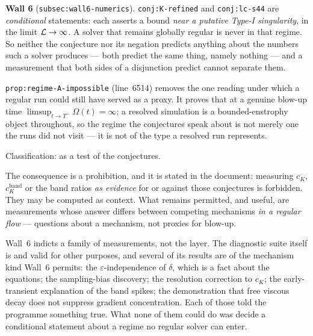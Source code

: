 \begin{record}
\textbf{Wall 6} (\texttt{subsec:wall6-numerics}). \texttt{conj:K-refined} and
\texttt{conj:lc-s44} are \emph{conditional} statements: each asserts a bound
\emph{near a putative Type-I singularity}, in the limit \(\mathcal{L}\to\infty\). A
solver that remains globally regular is never in that regime. So neither the
conjecture nor its negation predicts anything about the numbers such a solver
produces --- both predict the same thing, namely nothing --- and a measurement
that both sides of a disjunction predict cannot separate them.

\smallskip
\texttt{prop:regime-A-impossible} (line~6514) removes the one reading under
which a regular run could still have served as a proxy. It proves that at a
genuine blow-up time \(\limsup_{t\to T^-}\Omega(t)=\infty\); a resolved
simulation is a bounded-enstrophy object throughout, so the regime the
conjectures speak about is not merely one the runs did not visit --- it is not
of the type a resolved run represents.

\smallskip
Classification: \IMPOSSIBLE{} as a test of the conjectures.
\end{record}

The consequence is a prohibition, and it is stated in the document: measuring
\(c_K\), \(c_K^{\mathrm{band}}\) or the band ratios \emph{as evidence} for or
against those conjectures is forbidden. They may be computed as context. What
remains permitted, and useful, are measurements whose answer differs between
competing mechanisms \emph{in a regular flow} --- questions about a mechanism,
not proxies for blow-up.

\begin{obsv}
\label{obs:layer4-value}
Wall~6 indicts a family of measurements, not the layer. The diagnostic suite
itself is \OPEN{} and valid for other purposes, and several of its results are
of the mechanism kind Wall~6 permits: the \(\varepsilon\)-independence of
\(\delta\), which is a fact about the equations; the sampling-bias discovery;
the resolution correction to \(c_K\); the early-transient explanation of the
band spikes; the demonstration that free viscous decay does not suppress
gradient concentration. Each of those told the programme something true. What
none of them could do was decide a conditional statement about a regime no
regular solver can enter.
\end{obsv}
